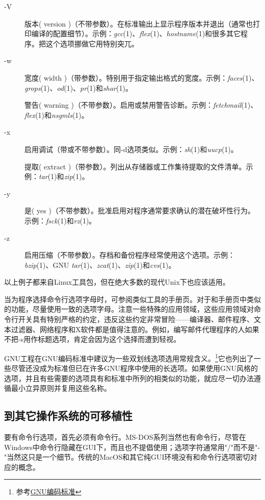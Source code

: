 \documentclass[12pt,oneside]{book}
\begin{document}
\begin{common-format}
\begin{description}
\item[-V] 版本( version )（不带参数）。在标准输出上显示程序版本并退出（通常也打印编译的配置细节）。示例：\textit{gcc}(1)、\textit{flex}(1)、\textit{hostname}(1)和很多其它程序。把这个选项挪做它用特别突兀。

\item[-w] 宽度( width )（带参数）。特别用于指定输出格式的宽度。示例：\textit{faces}(1)、\textit{grops}(1)、\textit{od}(1)、\textit{pr}(1)和\textit{shar}(1)。

警告( warning )（不带参数）。启用或禁用警告诊断。示例：\textit{fetchmail}(1)、\textit{flex}(1)和\textit{nsgmls}(1)。

\item[-x] 启用调试（带或不带参数）。同-d选项类似。示例：\textit{sh}(1)和\textit{uucp}(1)。
    
提取( extract )（带参数）。列出从存储器或工作集待提取的文件清单。示例：\textit{tar}(1)和\textit{zip}(1)。

\item[-y] 是( yes )（不带参数）。批准启用对程序通常要求确认的潜在破坏性行为。示例：\textit{fsck}(1)和\textit{rz}(1)。

\item[-z] 启用压缩（不带参数）。存档和备份程序经常使用这个选项。示例：\textit{bzip}(1)、GNU \textit{tar}(1)、\textit{zcat}(1)、\textit{zip}(1)和\textit{cvs}(1)。
\end{description}

以上例子都来自Linux工具包，但在绝大多数的现代Unix下也应该适用。

当为程序选择命令行选项字母时，可参阅类似工具的手册页。对于和手册页中类似的功能，尽量使用一致的选项字母。注意一些特殊的应用领域，这些应用领域对命令行开关具有特别严格的约定，违反这些约定非常冒险——编译器、邮件程序、文本过滤器、网络程序和X软件都是值得注意的。例如，编写邮件代理程序的人如果不把-s用作标题选项，肯定会因为这个选择而遭到轻视。

GNU工程在GNU编码标准中建议为一些双划线选项选用常规含义。\footnote{参考\href{http://www.gnu.org/prep/standards.html}{GNU编码标准}}它也列出了一些尽管还没成为标准但已在许多GNU程序中使用的长选项。如果使用GNU风格的选项，并且有些需要的选项具有和标准中所列的相类似的功能，就应尽一切办法遵循最小立异原则并复用这些名称。

\subsection{到其它操作系统的可移植性}
要有命令行选项，首先必须有命令行。MS-DOS系列当然也有命令行，尽管在Windows中命令行隐藏在GUI下，而且也不提倡使用；选项字符通常用"/"而不是"-"当然这只是一个细节。传统的MacOS和其它纯GUI环境没有和命令行选项密切对应的概念。



\end{common-format}
\end{document}
